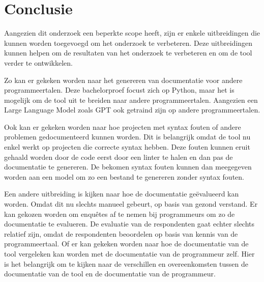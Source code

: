 
\chapter{Conclusie}%
\label{ch:conclusie}







Aangezien dit onderzoek een beperkte scope heeft, zijn er enkele uitbreidingen die kunnen worden toegevoegd om het onderzoek te verbeteren.
Deze uitbreidingen kunnen helpen om de resultaten van het onderzoek te verbeteren en om de tool verder te ontwikkelen.

Zo kan er gekeken worden naar het genereren van documentatie voor andere programmeertalen.
Deze bachelorproef focust zich op Python, maar het is mogelijk om de tool uit te breiden naar andere programmeertalen.
Aangezien een Large Language Model zoals GPT \autocite{OpenAi2024} ook getraind zijn op andere programmeertalen.

Ook kan er gekeken worden naar hoe projecten met syntax fouten of andere problemen gedocumenteerd kunnen worden.
Dit is belangrijk omdat de tool nu enkel werkt op projecten die correcte syntax hebben.
Deze fouten kunnen eruit gehaald worden door de code eerst door een linter te halen en dan pas de documentatie te genereren.
De bekomen syntax fouten kunnen dan meegegeven worden aan een model om zo een bestand te genereren zonder syntax fouten.

Een andere uitbreiding is kijken naar hoe de documentatie geëvalueerd kan worden.
Omdat dit nu slechts manueel gebeurt, op basis van gezond verstand. 
Er kan gekozen worden om enquêtes af te nemen bij programmeurs om zo de documentatie te evalueren.
De evaluatie van de respondenten gaat echter slechts relatief zijn, omdat de respondenten beoordelen op basis van kennis van de programmeertaal. 
Of er kan gekeken worden naar hoe de documentatie van de tool vergeleken kan worden met de documentatie van de programmeur zelf.
Hier is het belangrijk om te kijken naar de verschillen en overeenkomsten tussen de documentatie van de tool en de documentatie van de programmeur.

